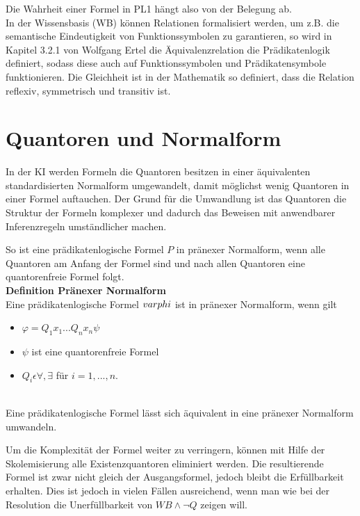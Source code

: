 \glqq Die Wahrheit einer Formel in PL1 hängt also von der Belegung ab.\grqq{}\cite[S.40]{GrundkursKI}\\

In der Wissensbasis (WB) können Relationen formalisiert werden, um z.B. die semantische Eindeutigkeit von Funktionssymbolen zu garantieren, so wird in Kapitel 3.2.1 von Wolfgang Ertel die Äquivalenzrelation die Prädikatenlogik definiert, sodass diese auch auf Funktionssymbolen und Prädikatensymbole funktionieren. Die Gleichheit ist in der Mathematik so definiert, dass die Relation reflexiv, symmetrisch und transitiv ist.\cite[S.43]{GrundkursKI}


\section{Quantoren und Normalform}
\label{Quantoren und Normalform}
In der KI werden Formeln die Quantoren besitzen in einer äquivalenten standardisierten Normalform umgewandelt, damit möglichst wenig Quantoren in einer Formel auftauchen. Der Grund für die Umwandlung ist das Quantoren die Struktur der Formeln komplexer und dadurch das Beweisen mit anwendbarer Inferenzregeln umständlicher machen. \cite[vgl. S.44]{GrundkursKI}

So ist eine prädikatenlogische Formel $P$ in pränexer Normalform, wenn alle Quantoren am Anfang der Formel sind und nach allen Quantoren eine quantorenfreie Formel folgt. \cite[vgl. S.44]{GrundkursKI}\\

\textbf{Definition Pränexer Normalform}\\
Eine prädikatenlogische Formel $\\varphi$ ist in pränexer Normalform, wenn gilt
\begin{itemize}
\item $\varphi = Q_1x_1...Q_nx_n\psi$ 
\item $\psi$ ist eine quantorenfreie Formel
\item $Q_i \epsilon {\forall,\exists}$ für $i=1,...,n$.
\end{itemize}
\cite[vgl. S.44 Def. 3.6]{GrundkursKI}\\
Eine prädikatenlogische Formel lässt sich äquivalent in eine pränexer Normalform umwandeln. \cite[vgl. S.46 Satz 3.2]{GrundkursKI}

Um die Komplexität der Formel weiter zu verringern, können mit Hilfe der Skolemisierung alle Existenzquantoren eliminiert werden. Die resultierende Formel ist zwar nicht gleich der Ausgangsformel, jedoch bleibt die Erfüllbarkeit erhalten. Dies ist jedoch in vielen Fällen ausreichend, wenn man wie bei der Resolution die Unerfüllbarkeit von $WB \wedge \neg Q$ zeigen will.\cite[vgl. S.46]{GrundkursKI} 


